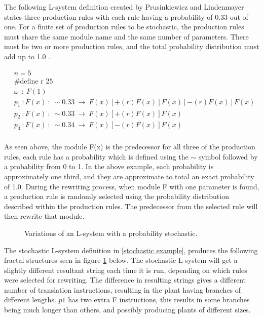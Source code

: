 The following L-system definition created by Prusinkiewicz and Lindenmayer states three production rules with each rule having a probability of 0.33 out of one. For a finite set of production rules to be stochastic, the production rules must share the same module name and the same number of parameters. There must be two or more production rules, and the total probability distribution must add up to 1.0 \cite{prusinkiewicz2012algorithmic}.

\begin{equation} \label{stochastic example}
\begin{aligned}
	&n=5\\
	&\text{\#define r 25}\\
	&\omega~~ :~ F(1)\\
	&p_1~ :  F(x)~ :~ \sim 0.33 ~ \rightarrow~ F(x)[+(r)F(x)]F(x)[-(r)F(x)]F(x)\\
	&p_2~ :  F(x)~ :~ \sim 0.33 ~ \rightarrow~ F(x)[+(r)F(x)]F(x)\\
	&p_3~ :  F(x)~ :~ \sim 0.34 ~ \rightarrow~ F(x)[-(r)F(x)]F(x)\\
\end{aligned}
\end{equation}

\noindent
As seen above, the module F(x) is the predecessor for all three of the production rules, each rule has a probability which is defined using the $\sim$ symbol followed by a probability from 0 to  1. In the above example, each probability is approximately one third, and they are approximate to total an exact probability of 1.0. During the rewriting process, when module F with one parameter is found, a production rule is randomly selected using the probability distribution described within the production rules. The predecessor from the selected rule will then rewrite that module.

\begin{figure}[htbp]
	{\centering
		\vspace{7px}
		\setlength{\fboxrule}{1pt}
		\caption{Variations of an L-system with a probability stochastic.} \label{stochastic diagram}
	}
\end{figure}
\FloatBarrier

\noindent
The stochastic L-system definition in \ref{stochastic example}, produces the following fractal structures seen in figure \ref{stochastic diagram} below. The stochastic L-system will get a slightly different resultant string each time it is run, depending on which rules were selected for rewriting. The difference in resulting strings gives a different number of translation instructions, resulting in the plant having branches of different lengths. $p1$ has two extra F instructions, this results in some branches being much longer than others, and possibly producing plants of different sizes. 


